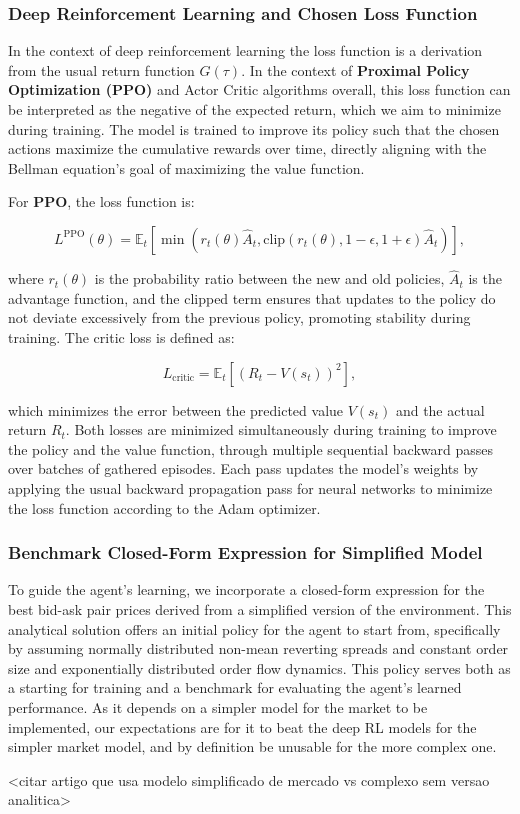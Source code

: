 \subsubsection{Deep Reinforcement Learning and Chosen Loss Function}

In the context of deep reinforcement learning the loss function is a derivation from the usual return function \( G(\tau) \).
In the context of \textbf{Proximal Policy Optimization (PPO)} and Actor Critic algorithms overall,
this loss function can be interpreted as the negative of the expected return, which we aim to minimize during training.
The model is trained to improve its policy such that the chosen actions maximize the cumulative rewards over time,
directly aligning with the Bellman equation's goal of maximizing the value function.

For \textbf{PPO}, the loss function is:

\[
    L^{\text{PPO}}(\theta) = \mathbb{E}_t \left[ \min \left( r_t(\theta) \hat{A}_t, \text{clip}(r_t(\theta), 1 - \epsilon, 1 + \epsilon) \hat{A}_t \right) \right],
\]

where \( r_t(\theta) \) is the probability ratio between the new and old policies, \( \hat{A}_t \) is the advantage function,
and the clipped term ensures that updates to the policy do not deviate excessively from the previous policy, promoting stability during training.
The critic loss is defined as:

\[
    L_{\text{critic}} = \mathbb{E}_t \left[ \left( R_t - V(s_t) \right)^2 \right],
\]

which minimizes the error between the predicted value \( V(s_t) \) and the actual return \( R_t \).
Both losses are minimized simultaneously during training to improve the policy and the value function,
through multiple sequential backward passes over batches of gathered episodes.
Each pass updates the model's weights by applying the usual backward propagation pass for neural networks to minimize the loss function according to the Adam optimizer.

\subsubsection{Benchmark Closed-Form Expression for Simplified Model}

To guide the agent's learning, we incorporate a closed-form expression for the best bid-ask pair prices derived from a simplified version of the environment.
This analytical solution offers an initial policy for the agent to start from,
specifically by assuming normally distributed non-mean reverting spreads and constant order size and exponentially distributed order flow dynamics.
This policy serves both as a starting for training and a benchmark for evaluating the agent's learned performance.
As it depends on a simpler model for the market to be implemented, our expectations are for it to beat the deep RL models for the simpler market model,
and by definition be unusable for the more complex one.

<citar artigo que usa modelo simplificado de mercado vs complexo sem versao analitica>
